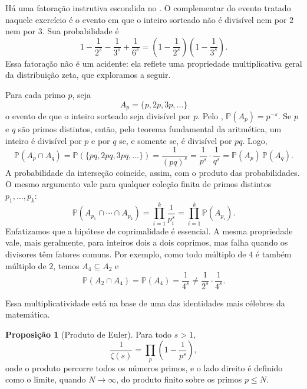 \documentclass[12pt,portuguese]{article}
\let\leq\leqslant
\theoremstyle{definition}
\newtheorem{proposition}[proposition]{Proposição}
\begin{document}
Há uma fatoração instrutiva escondida no . O complementar
do evento tratado naquele exercício é o evento em que o inteiro sorteado não é
divisível nem por \(2\) nem por \(3\). Sua probabilidade é
\[
1 - \frac{1}{2^s} - \frac{1}{3^s} + \frac{1}{6^s}
= \left(1 - \frac{1}{2^s}\right)\left(1 - \frac{1}{3^s}\right).
\]
Essa fatoração não é um acidente: ela reflete uma propriedade
multiplicativa geral da distribuição zeta, que exploramos a seguir.

Para cada primo \(p\), seja
\[
A_p = \{p, 2p, 3p, \dots\}
\]
o evento de que o inteiro sorteado seja divisível por \(p\). Pelo
, \(\mathbb{P}(A_p) = p^{-s}\). Se \(p\) e \(q\) são primos
distintos, então, pelo teorema fundamental da aritmética, um inteiro é
divisível por \(p\) e por \(q\) se, e somente se, é divisível por \(pq\).
Logo,
\[
\mathbb{P}(A_p \cap A_q)
= \mathbb{P}(\{pq, 2pq, 3pq, \dots\})
= \frac{1}{(pq)^s}
= \frac{1}{p^s} \cdot \frac{1}{q^s}
= \mathbb{P}(A_p)\,\mathbb{P}(A_q).
\]
A probabilidade da interseção coincide, assim, com o produto das
probabilidades. O mesmo argumento vale para qualquer coleção finita de
primos distintos \(p_1, \dots, p_k\):
\[
\mathbb{P}(A_{p_1} \cap \cdots \cap A_{p_k})
= \prod_{i=1}^{k} \frac{1}{p_i^s}
= \prod_{i=1}^{k} \mathbb{P}(A_{p_i}).
\]
Enfatizamos que a hipótese de coprimalidade é essencial. A mesma propriedade
vale, mais geralmente, para inteiros dois a dois coprimos, mas falha quando os
divisores têm fatores comuns. Por exemplo, como todo múltiplo de \(4\) é também
múltiplo de \(2\), temos \(A_4 \subseteq A_2\) e
\[
\mathbb{P}(A_2 \cap A_4) = \mathbb{P}(A_4) = \frac{1}{4^s}
\neq \frac{1}{2^s} \cdot \frac{1}{4^s}.
\]

Essa multiplicatividade está na base de uma das identidades mais célebres
da matemática.

\begin{proposition}[Produto de Euler]\label{prop:euler}
Para todo \(s > 1\),
\[
\frac{1}{\zeta(s)} = \prod_{p} \left(1 - \frac{1}{p^s}\right),
\]
onde o produto percorre todos os números primos, e o lado direito é
definido como o limite, quando \(N \to \infty\), do produto finito sobre
os primos \(p \leq N\).
\end{proposition}
\end{document}
